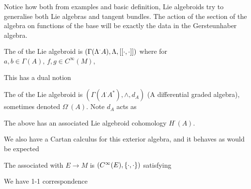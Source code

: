 \documentclass{article}
\begin{document}
Notice how both from examples and basic definition, Lie algebroids try to generalise both Lie algebras and tangent bundles. The action of the section of the algebra on functions of the base will be exactly the data in the Gersteunhaber algebra. 

\begin{definition}
The  of the Lie algebroid is $(\Gamma(\Lambda^\cdot A),\Lambda,\dcomm[\cdot]{\cdot})$ where for $a,b \in \Gamma(A), \, f,g \in C^\infty(M)$,
\end{definition}

This has a dual notion 

\begin{definition}
The  of the Lie algebroid is $(\Gamma(\Lambda^\cdot A^\ast),\wedge,d_A)$ (A differential graded algebra), sometimes denoted $\Omega^\cdot(A)$. Note $d_A$ acts as 
\end{definition}

\begin{remark}
The above has an associated Lie algebroid cohomology $H^\cdot(A)$. 
\end{remark}

We also have a Cartan calculus for this exterior algebra, and it behaves as would be expected 

\begin{definition}
The  associated with $E \to M$ is $(C^\infty(E),\acomm[\cdot]{\cdot})$ satisfying 
\end{definition}

\begin{prop}
We have 1-1 correspondence 
\end{prop}
\end{document}
